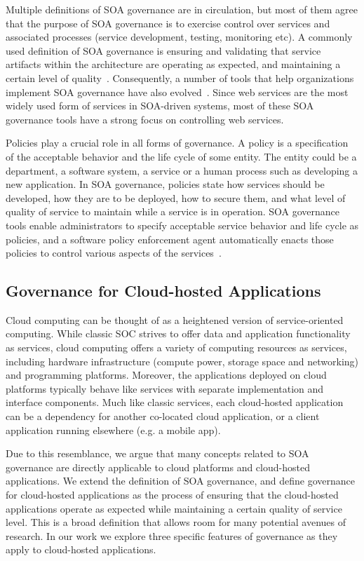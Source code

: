 Multiple definitions of SOA governance
are in circulation, but most of them agree that the purpose of SOA governance is to exercise control over
services and associated processes (service development, testing, monitoring etc). A commonly used definition
of SOA governance is ensuring and validating that service artifacts within the architecture are operating
as expected, and maintaining a certain level of quality~\cite{gartner-soa-gov}.
Consequently, a number of tools that help organizations implement SOA governance 
have also evolved~\cite{Schepers:2008:LAS:1363686.1363932,4730489,6478236,5577268}.
Since web services are the most widely used form of services in SOA-driven systems, most of these
SOA governance tools have a strong focus on controlling web services. 

Policies play a crucial role in all forms of governance. A policy is a specification of the acceptable behavior
and the life cycle of some entity. The entity could be a department, a software system, a service or a 
human process such as developing
a new application. In SOA governance, policies state how services should be developed, how they are to be
deployed, how to secure them, and what level of quality of service to maintain while a service is in operation.
SOA governance tools enable administrators to specify acceptable service behavior and life cycle as policies, and
a software policy enforcement agent automatically enacts those policies to control various aspects of the 
services~\cite{5976827,4483228,4279691}. 

\subsection{Governance for Cloud-hosted Applications}
Cloud computing can be thought of as a heightened version of service-oriented computing. While classic
SOC strives to offer data and application functionality as services, cloud computing offers a variety
of computing resources
as services, including hardware infrastructure (compute power, storage space and networking) and programming
platforms. Moreover, the applications deployed on cloud platforms typically behave like services with
separate implementation and interface components. 
Much like classic services, each cloud-hosted application 
can be a dependency for another
co-located cloud application, or a client application running elsewhere (e.g. a mobile app). 

Due to this resemblance, we argue that many concepts related to SOA governance are
directly applicable to cloud platforms and cloud-hosted applications. 
We extend the definition of SOA governance, and define governance for cloud-hosted applications
as the process of ensuring that the cloud-hosted applications
operate as expected while maintaining a certain quality of service level.
This is a broad definition that allows room for many potential avenues of research.
In our work we explore three specific features of governance as they apply to cloud-hosted applications.

